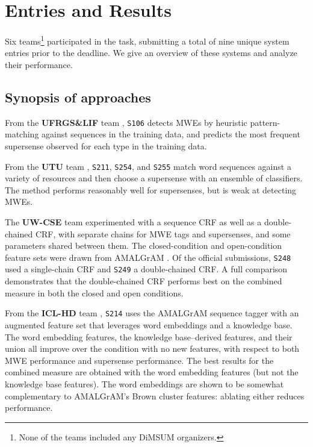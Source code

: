 \documentclass[11pt,letterpaper]{article}
\newcommand{\sys}[1]{\mbox{\texttt{#1}}}   %
\begin{document}
\section{Entries and Results}\label{sec:results}

Six teams\footnote{None of the teams included any DiMSUM organizers.} participated in the task, 
submitting a total of nine unique system entries prior to the deadline. 
We give an overview of these systems and analyze their performance.

\subsection{Synopsis of approaches}

From the \textbf{UFRGS\&LIF} team \citep{dimsum-16-ufrgs},
\sys{S106} detects MWEs by heuristic pattern-matching against sequences in the training data, 
and predicts the most frequent supersense observed for each type in the training data.

From the \textbf{UTU} team \citep{dimsum-16-utu},
\sys{S211}, \sys{S254}, and \sys{S255} 
match word sequences against a variety of resources
and then choose a supersense with an ensemble of classifiers. 
The method performs reasonably well for supersenses, but is weak at detecting MWEs.


The \textbf{UW-CSE} team \citep{dimsum-16-uw} 
experimented with a sequence CRF as well as a double-chained CRF, 
with separate chains for MWE tags and supersenses, and some parameters shared between them.
The closed-condition and open-condition feature sets were drawn from AMALGrAM \citep{schneider-15}.
Of the official submissions, \sys{S248} used a single-chain CRF and \sys{S249} a double-chained CRF.
A full comparison demonstrates that the double-chained CRF performs best on the combined measure 
in both the closed and open conditions. 

From the \textbf{ICL-HD} team \citep{dimsum-16-icl},
\sys{S214} uses the AMALGrAM sequence tagger \citep{schneider-15} 
with an augmented feature set that leverages word embeddings 
and a knowledge base. The word embedding features, the knowledge base--derived 
features, and their union all improve over the condition with no new features, 
with respect to both MWE performance and supersense performance. 
The best results for the combined measure are obtained with the 
word embedding features (but not the knowledge base features). 
The word embeddings are shown to be somewhat complementary 
to AMALGrAM's Brown cluster features: ablating either reduces performance.
\end{document}
